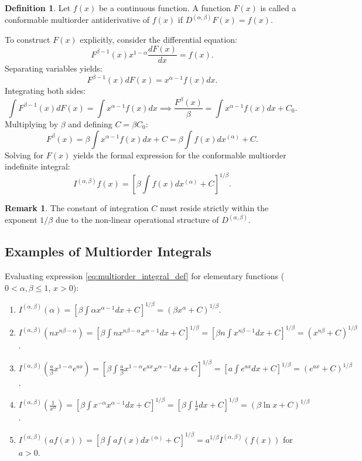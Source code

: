 \documentclass[oneside,10pt]{article}
\theoremstyle{plain}
\theoremstyle{definition}
\newtheorem{definition}[theorem]{Definition}
\newtheorem{remark}[theorem]{Remark}
\begin{document}
\begin{definition}
Let $f(x)$ be a continuous function. A function $F(x)$ is called a conformable multiorder antiderivative of $f(x)$ if $D^{(\alpha,\beta)} F(x) = f(x)$.
\end{definition}

To construct $F(x)$ explicitly, consider the differential equation:
\begin{equation}
F^{\beta-1}(x) x^{1-\alpha} \frac{dF(x)}{dx} = f(x).
\end{equation}
Separating variables yields:
\[
F^{\beta-1}(x) dF(x) = x^{\alpha-1} f(x) dx.
\]
Integrating both sides:
\[
\int F^{\beta-1}(x) dF(x) = \int x^{\alpha-1} f(x) dx \implies \frac{F^\beta(x)}{\beta} = \int x^{\alpha-1} f(x) dx + C_0.
\]
Multiplying by $\beta$ and defining $C = \beta C_0$:
\[
F^\beta(x) = \beta \int x^{\alpha-1} f(x) dx + C = \beta \int f(x) dx^{(\alpha)} + C.
\]
Solving for $F(x)$ yields the formal expression for the conformable multiorder indefinite integral:
\begin{equation}\label{eq:multiorder_integral_def}
I^{(\alpha,\beta)} f(x) = \left[ \beta \int f(x) dx^{(\alpha)} + C \right]^{1/\beta}.
\end{equation}

\begin{remark}
The constant of integration $C$ must reside strictly within the exponent $1/\beta$ due to the non-linear operational structure of $D^{(\alpha,\beta)}$.
\end{remark}

\subsection{Examples of Multiorder Integrals}

Evaluating expression \eqref{eq:multiorder_integral_def} for elementary functions ($0 < \alpha, \beta \le 1$, $x > 0$):
\begin{enumerate}
    \item $I^{(\alpha,\beta)}(\alpha) = \left[ \beta \int \alpha x^{\alpha-1} dx + C \right]^{1/\beta} = (\beta x^\alpha + C)^{1/\beta}$.
    \item $I^{(\alpha,\beta)}(n x^{n\beta-\alpha}) = \left[ \beta \int n x^{n\beta-\alpha} x^{\alpha-1} dx + C \right]^{1/\beta} = \left[ \beta n \int x^{n\beta-1} dx + C \right]^{1/\beta} = (x^{n\beta} + C)^{1/\beta}$.
    \item $I^{(\alpha,\beta)}\left(\frac{a}{\beta} x^{1-\alpha} e^{ax}\right) = \left[ \beta \int \frac{a}{\beta} x^{1-\alpha} e^{ax} x^{\alpha-1} dx + C \right]^{1/\beta} = \left[ a \int e^{ax} dx + C \right]^{1/\beta} = (e^{ax} + C)^{1/\beta}$.
    \item $I^{(\alpha,\beta)}\left(\frac{1}{x^\alpha}\right) = \left[ \beta \int x^{-\alpha} x^{\alpha-1} dx + C \right]^{1/\beta} = \left[ \beta \int \frac{1}{x} dx + C \right]^{1/\beta} = (\beta \ln x + C)^{1/\beta}$.
    \item $I^{(\alpha,\beta)}(a f(x)) = \left[ \beta \int a f(x) dx^{(\alpha)} + C \right]^{1/\beta} = a^{1/\beta} I^{(\alpha,\beta)}(f(x))$ for $a > 0$.
\end{enumerate}
\end{document}

